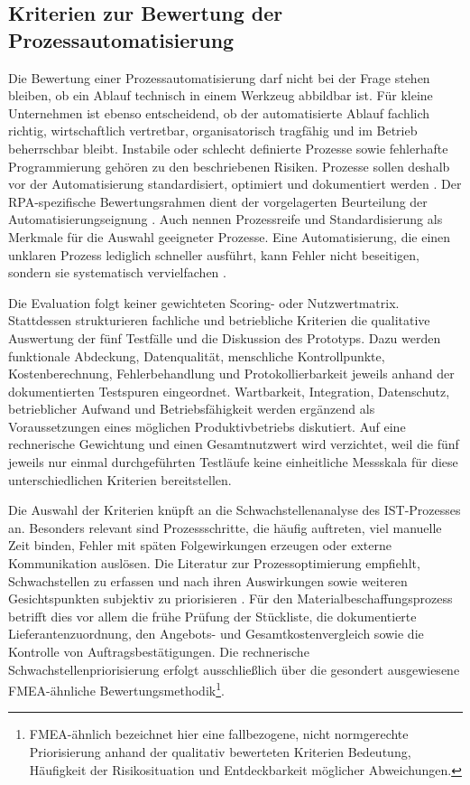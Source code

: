 \documentclass[a4paper,12pt]{article}
\begin{document}
\subsection{Kriterien zur Bewertung der Prozessautomatisierung}
Die Bewertung einer Prozessautomatisierung darf nicht bei der Frage stehen bleiben, ob ein Ablauf technisch in einem Werkzeug abbildbar ist. Für kleine Unternehmen ist ebenso entscheidend, ob der automatisierte Ablauf fachlich richtig, wirtschaftlich vertretbar, organisatorisch tragfähig und im Betrieb beherrschbar bleibt. Instabile oder schlecht definierte Prozesse sowie fehlerhafte Programmierung gehören zu den beschriebenen Risiken. Prozesse sollen deshalb vor der Automatisierung standardisiert, optimiert und dokumentiert werden \parencite{brettschneider_bewertung_2020}. Der RPA-spezifische Bewertungsrahmen dient der vorgelagerten Beurteilung der Automatisierungseignung \parencite{wellmann_framework_2020}. Auch \textcite{moreira_business_2024} nennen Prozessreife und Standardisierung als Merkmale für die Auswahl geeigneter Prozesse. Eine Automatisierung, die einen unklaren Prozess lediglich schneller ausführt, kann Fehler nicht beseitigen, sondern sie systematisch vervielfachen \parencite{moreira_business_2024,santos_rebooting_2025}.

Die Evaluation folgt keiner gewichteten Scoring- oder Nutzwertmatrix. Stattdessen strukturieren fachliche und betriebliche Kriterien die qualitative Auswertung der fünf Testfälle und die Diskussion des Prototyps. Dazu werden funktionale Abdeckung, Datenqualität, menschliche Kontrollpunkte, Kostenberechnung, Fehlerbehandlung und Protokollierbarkeit jeweils anhand der dokumentierten Testspuren eingeordnet. Wartbarkeit, Integration, Datenschutz, betrieblicher Aufwand und Betriebsfähigkeit werden ergänzend als Voraussetzungen eines möglichen Produktivbetriebs diskutiert. Auf eine rechnerische Gewichtung und einen Gesamtnutzwert wird verzichtet, weil die fünf jeweils nur einmal durchgeführten Testläufe keine einheitliche Messskala für diese unterschiedlichen Kriterien bereitstellen.

Die Auswahl der Kriterien knüpft an die Schwachstellenanalyse des IST-Prozesses an. Besonders relevant sind Prozessschritte, die häufig auftreten, viel manuelle Zeit binden, Fehler mit späten Folgewirkungen erzeugen oder externe Kommunikation auslösen. Die Literatur zur Prozessoptimierung empfiehlt, Schwachstellen zu erfassen und nach ihren Auswirkungen sowie weiteren Gesichtspunkten subjektiv zu priorisieren \parencite{kompetenzzentrum_augsburg_prozessoptimierung_2020}. Für den Materialbeschaffungsprozess betrifft dies vor allem die frühe Prüfung der Stückliste, die dokumentierte Lieferantenzuordnung, den Angebots- und Gesamtkostenvergleich sowie die Kontrolle von Auftragsbestätigungen. Die rechnerische Schwachstellenpriorisierung erfolgt ausschließlich über die gesondert ausgewiesene FMEA-ähnliche Bewertungsmethodik\footnote{FMEA-ähnlich bezeichnet hier eine fallbezogene, nicht normgerechte Priorisierung anhand der qualitativ bewerteten Kriterien Bedeutung, Häufigkeit der Risikosituation und Entdeckbarkeit möglicher Abweichungen.}.
\end{document}
